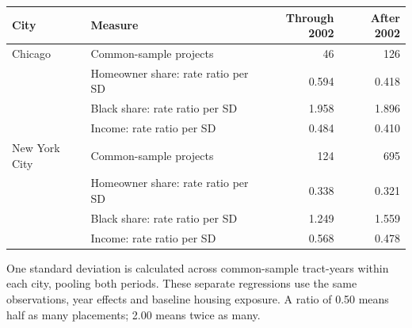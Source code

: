 \begin{center}\begin{tabular}{llrr}\hline
City & Measure & Through 2002 & After 2002 \\ \hline
Chicago & Common-sample projects & 46 & 126 \\
 & Homeowner share: rate ratio per SD & 0.594 & 0.418 \\
 & Black share: rate ratio per SD & 1.958 & 1.896 \\
 & Income: rate ratio per SD & 0.484 & 0.410 \\
New York City & Common-sample projects & 124 & 695 \\
 & Homeowner share: rate ratio per SD & 0.338 & 0.321 \\
 & Black share: rate ratio per SD & 1.249 & 1.559 \\
 & Income: rate ratio per SD & 0.568 & 0.478 \\
\hline\end{tabular}\end{center}
One standard deviation is calculated across common-sample tract-years within each city, pooling both periods. These separate regressions use the same observations, year effects and baseline housing exposure. A ratio of 0.50 means half as many placements; 2.00 means twice as many.\par
